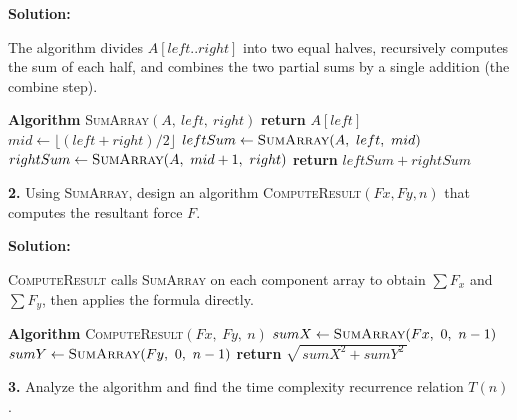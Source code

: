 \documentclass[12pt]{article}
\newcommand{\algoname}[1]{\textsc{#1}}
\newcommand{\AlgorithmLine}[1]{\State \textbf{Algorithm} \algoname{#1}}
\begin{document}
\begin{mdframed}
\noindent\textbf{Solution:}

\smallskip
\noindent
The algorithm divides $A[left..right]$ into two equal halves, recursively
computes the sum of each half, and combines the two partial sums by a single
addition (the combine step).

\medskip

\begin{algorithm}[H]
\begin{algorithmic}[1]
\AlgorithmLine{SumArray$(A,\ left,\ right)$}
    \State \textbf{return} $A[left]$
\Else
    \State $mid \leftarrow \lfloor(left + right) / 2\rfloor$
    \State $leftSum  \leftarrow \algoname{SumArray}(A,\ left,\ mid)$
    \State $rightSum \leftarrow \algoname{SumArray}(A,\ mid+1,\ right)$
    \State \textbf{return} $leftSum + rightSum$
\EndIf
\end{algorithmic}
\end{algorithm}
\end{mdframed}

\bigskip

\noindent\textbf{2.} Using \algoname{SumArray}, design an algorithm
\algoname{ComputeResult}$(Fx, Fy, n)$ that computes the resultant force $F$.

\medskip

\begin{mdframed}
\noindent\textbf{Solution:}

\smallskip
\noindent
\algoname{ComputeResult} calls \algoname{SumArray} on each component array to
obtain $\sum F_x$ and $\sum F_y$, then applies the formula directly.

\medskip

\begin{algorithm}[H]
\begin{algorithmic}[1]
\AlgorithmLine{ComputeResult$(Fx,\ Fy,\ n)$}
\State $sumX \leftarrow \algoname{SumArray}(Fx,\ 0,\ n-1)$
\State $sumY \leftarrow \algoname{SumArray}(Fy,\ 0,\ n-1)$
\State \textbf{return} $\sqrt{\,sumX^2 + sumY^2\,}$
\end{algorithmic}
\end{algorithm}
\end{mdframed}

\bigskip

\noindent\textbf{3.} Analyze the algorithm and find the time complexity
recurrence relation $T(n)$.
\end{document}
